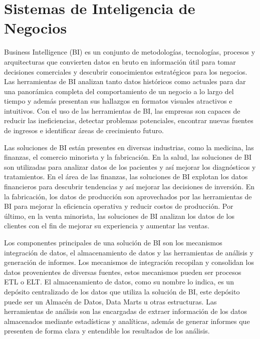 \chapter{Sistemas de Inteligencia de Negocios}\label{chapter:bi-systems}

Business Intelligence (BI) es un conjunto de metodologías, tecnologías, procesos y arquitecturas que convierten datos 
en bruto en información útil para tomar decisiones comerciales y descubrir conocimientos estratégicos para los negocios. 
Las herramientas de BI analizan tanto datos históricos como actuales para dar una panor\'amica completa del comportamiento 
de un negocio a lo largo del tiempo y adem\'as presentan sus hallazgos en formatos visuales atractivos e intuitivos. 
Con el uso de las herramientas de BI, las empresas son capaces de reducir las ineficiencias, detectar problemas potenciales, 
encontrar nuevas fuentes de ingresos e identificar áreas de crecimiento futuro.

Las soluciones de BI est\'an presentes en diversas industrias, como la medicina, las finanzas, el comercio minorista y la 
fabricación. En la salud, las soluciones de BI son utilizadas para analizar datos de los pacientes y as\'i mejorar los
diagn\'osticos y tratamientos. En el \'area de las finanzas, las soluciones de BI explotan los datos financieros para 
descubrir tendencias y as\'i mejorar las decisiones de inversi\'on. En la fabricación, los datos de producción son aprovechados 
por las herramientas de BI para mejorar la eficiencia operativa y reducir costos de producción. Por \'ultimo, en la 
venta minorista, las soluciones de BI analizan los datos de los clientes con el fin de mejorar su experiencia y 
aumentar las ventas.

Los componentes principales de una solución de BI son los mecanismos integración de datos, el almacenamiento de datos y 
las herramientas de análisis y generaci\'on de informes. Los mecanismos de integración recopilan y  
consolidan los datos provenientes de diversas fuentes, estos mecanismos pueden ser procesos ETL o ELT. 
El almacenamiento de datos, como su nombre lo indica, es un depósito centralizado de los datos que utiliza la solución
de BI, este depósito puede ser un Almac\'en de Datos, Data Marts u otras estructuras. Las herramientas de análisis 
son las encargadas de extraer información de los datos almacenados mediante estadísticas y analíticas, adem\'as de generar 
informes que presenten de forma clara y entendible los resultados de los an\'alisis.

